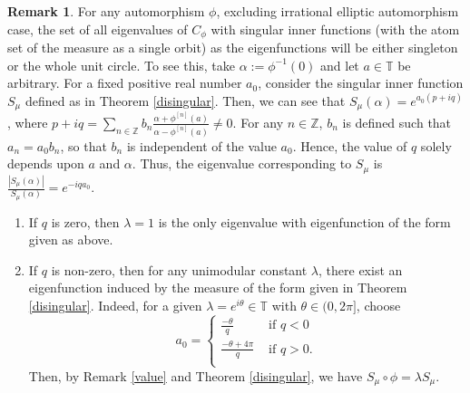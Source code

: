 \documentclass[12pt, reqno]{amsart}
\theoremstyle{definition}
\newtheorem{remark}[theorem]{Remark}
\numberwithin{equation}{section}
\begin{document}
\begin{remark}\label{discreteiegen}
For any automorphism $\phi$, excluding irrational elliptic automorphism case, the set  of all eigenvalues of $C_\phi$ with singular inner functions (with the atom set of the measure as a single orbit) as the eigenfunctions will be either singleton or the whole unit circle. To see this, 
take $\alpha:=\phi^{-1}(0)$ and let  $a\in \mathbb{T}$ be arbitrary. For a fixed positive real number $a_0$, consider the {singular inner function $S_\mu$ defined as in Theorem \ref{disingular}}. Then, we can see that $S_\mu(\alpha)= e^{a_0(p+iq)}$, where $p+iq=\sum_{n \in\mathbb{Z}}b_n\frac{\alpha+\phi^{[n]}(a)}{\alpha-\phi^{[n]}(a)} \neq 0$. For any $n \in \mathbb{Z}$, $b_n $ is defined such that  $a_n=a_0b_n$, so that $b_n $ is independent of the value  $a_0$. Hence, the value of $q$ solely depends upon $a$ and $\alpha$. Thus, the eigenvalue corresponding to $S_{\mu}$ is  $\frac{|S_\mu(\alpha)|}{S_\mu(\alpha)}=e^{-iqa_0}$.
	\begin{enumerate}
		\item  If $q$ is zero, then $\lambda=1$ is the only eigenvalue with eigenfunction of the form given as above.
		\item If $q$ is non-zero, then for any unimodular constant $\lambda$, there exist an eigenfunction induced by the measure of the form given in Theorem \ref{disingular}. 
		Indeed, for a given $\lambda=e^{i\theta }\in \mathbb{T}$ with $\theta \in (0,2\pi]$, choose $$a_0=\begin{cases}
			\frac{-\theta}{q}&\text{ if } q<0\\
			\frac{-\theta+4\pi}{q}&\text{ if } q>0.\\
		\end{cases}$$ Then, by Remark \ref{value}
		and Theorem \ref{disingular}, we have $S_\mu \circ \phi=\lambda S_\mu$.
	\end{enumerate}
	
\end{remark}
\end{document}
